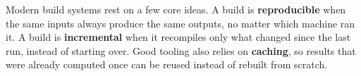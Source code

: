 \documentclass{article}
\newcommand{\keyword}[1]{\textbf{#1}}
\begin{document}
Modern build systems rest on a few core ideas. A build is
\keyword{reproducible} when the same inputs always produce the same
outputs, no matter which machine ran it. A build is
\keyword{incremental} when it recompiles only what changed since the
last run, instead of starting over. Good tooling also relies on
\keyword{caching}, so results that were already computed once can be
reused instead of rebuilt from scratch.
\end{document}
